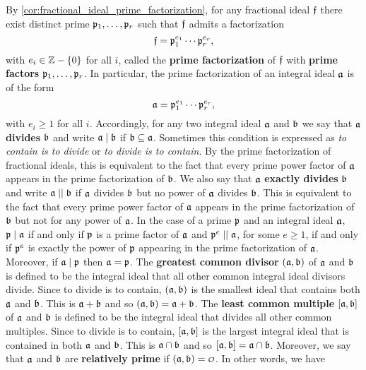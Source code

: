     By \cref{cor:fractional_ideal_prime_factorization}, for any fractional ideal $\mathfrak{f}$ there exist distinct prime $\mathfrak{p}_{1},\ldots,\mathfrak{p}_{r}$ such that $\mathfrak{f}$ admits a factorization
    \[
      \mathfrak{f} = \mathfrak{p}_{1}^{e_{1}} \cdots \mathfrak{p}_{r}^{e_{r}},
    \]
    with $e_{i} \in \mathbb{Z}-\{0\}$ for all $i$, called the \textbf{prime factorization} of $\mathfrak{f}$ with \textbf{prime factors} $\mathfrak{p}_{1},\ldots,\mathfrak{p}_{r}$. In particular, the prime factorization of an integral ideal $\mathfrak{a}$ is of the form
    \[
      \mathfrak{a} = \mathfrak{p}_{1}^{e_{1}} \cdots \mathfrak{p}_{r}^{e_{r}},
    \]
    with $e_{i} \ge 1$ for all $i$. Accordingly, for any two integral ideal $\mathfrak{a}$ and $\mathfrak{b}$ we say that $\mathfrak{a}$ \textbf{divides} $\mathfrak{b}$ and write $\mathfrak{a} \mid \mathfrak{b}$ if $\mathfrak{b} \subseteq \mathfrak{a}$. Sometimes this condition is expressed as \textit{to contain is to divide} or \textit{to divide is to contain}. By the prime factorization of fractional ideals, this is equivalent to the fact that every prime power factor of $\mathfrak{a}$ appears in the prime factorization of $\mathfrak{b}$. We also say that $\mathfrak{a}$ \textbf{exactly divides} $\mathfrak{b}$ and write $\mathfrak{a} \mid\mid \mathfrak{b}$ if $\mathfrak{a}$ divides $\mathfrak{b}$ but no power of $\mathfrak{a}$ divides $\mathfrak{b}$. This is equivalent to the fact that every prime power factor of $\mathfrak{a}$ appears in the prime factorization of $\mathfrak{b}$ but not for any power of $\mathfrak{a}$. In the case of a prime $\mathfrak{p}$ and an integral ideal $\mathfrak{a}$, $\mathfrak{p} \mid \mathfrak{a}$ if and only if $\mathfrak{p}$ is a prime factor of $\mathfrak{a}$ and $\mathfrak{p}^{e} \mid\mid \mathfrak{a}$, for some $e \ge 1$, if and only if $\mathfrak{p}^{e}$ is exactly the power of $\mathfrak{p}$ appearing in the prime factorization of $\mathfrak{a}$. Moreover, if $\mathfrak{a} \mid \mathfrak{p}$ then $\mathfrak{a} = \mathfrak{p}$. The \textbf{greatest common divisor} $(\mathfrak{a},\mathfrak{b})$ of $\mathfrak{a}$ and $\mathfrak{b}$ is defined to be the integral ideal that all other common integral ideal divisors divide. Since to divide is to contain, $(\mathfrak{a},\mathfrak{b})$ is the smallest ideal that contains both $\mathfrak{a}$ and $\mathfrak{b}$. This is $\mathfrak{a}+\mathfrak{b}$ and so $(\mathfrak{a},\mathfrak{b}) = \mathfrak{a}+\mathfrak{b}$. The \textbf{least common multiple} $[\mathfrak{a},\mathfrak{b}]$ of $\mathfrak{a}$ and $\mathfrak{b}$ is defined to be the integral ideal that divides all other common multiples. Since to divide is to contain, $[\mathfrak{a},\mathfrak{b}]$ is the largest integral ideal that is contained in both $\mathfrak{a}$ and $\mathfrak{b}$. This is $\mathfrak{a} \cap \mathfrak{b}$ and so $[\mathfrak{a},\mathfrak{b}] = \mathfrak{a} \cap \mathfrak{b}$. Moreover, we say that $\mathfrak{a}$ and $\mathfrak{b}$ are \textbf{relatively prime} if $(\mf{a},\mf{b}) = \smc{O}$. In other words, we have
